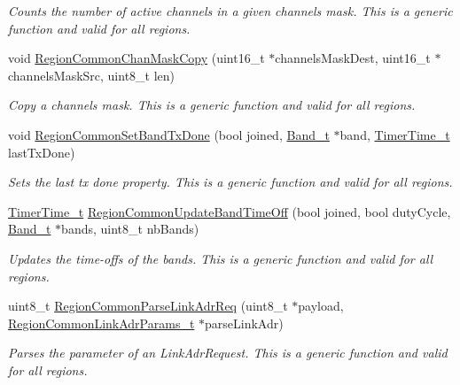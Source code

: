\begin{DoxyCompactItemize}
\begin{DoxyCompactList}\small\item\em Counts the number of active channels in a given channels mask. This is a generic function and valid for all regions. \end{DoxyCompactList}\item 
void \mbox{\hyperlink{group___r_e_g_i_o_n_c_o_m_m_o_n_ga95f5199d490113269fae7f2e0569e9a0}{Region\+Common\+Chan\+Mask\+Copy}} (uint16\+\_\+t $\ast$channels\+Mask\+Dest, uint16\+\_\+t $\ast$channels\+Mask\+Src, uint8\+\_\+t len)
\begin{DoxyCompactList}\small\item\em Copy a channels mask. This is a generic function and valid for all regions. \end{DoxyCompactList}\item 
void \mbox{\hyperlink{group___r_e_g_i_o_n_c_o_m_m_o_n_ga491dea5590228a0cd33affd71743779c}{Region\+Common\+Set\+Band\+Tx\+Done}} (bool joined, \mbox{\hyperlink{group___l_o_r_a_m_a_c_ga8f49721ee96ceb52c80a896ab11a2ed8}{Band\+\_\+t}} $\ast$band, \mbox{\hyperlink{utilities_8h_a4215ca43d3e953099ea758ce428599d0}{Timer\+Time\+\_\+t}} last\+Tx\+Done)
\begin{DoxyCompactList}\small\item\em Sets the last tx done property. This is a generic function and valid for all regions. \end{DoxyCompactList}\item 
\mbox{\hyperlink{utilities_8h_a4215ca43d3e953099ea758ce428599d0}{Timer\+Time\+\_\+t}} \mbox{\hyperlink{group___r_e_g_i_o_n_c_o_m_m_o_n_ga2e26fe6b49ca26edf7052eadd7f18b3a}{Region\+Common\+Update\+Band\+Time\+Off}} (bool joined, bool duty\+Cycle, \mbox{\hyperlink{group___l_o_r_a_m_a_c_ga8f49721ee96ceb52c80a896ab11a2ed8}{Band\+\_\+t}} $\ast$bands, uint8\+\_\+t nb\+Bands)
\begin{DoxyCompactList}\small\item\em Updates the time-\/offs of the bands. This is a generic function and valid for all regions. \end{DoxyCompactList}\item 
uint8\+\_\+t \mbox{\hyperlink{group___r_e_g_i_o_n_c_o_m_m_o_n_ga8403c78482dbb901014dba48b75d78e8}{Region\+Common\+Parse\+Link\+Adr\+Req}} (uint8\+\_\+t $\ast$payload, \mbox{\hyperlink{group___r_e_g_i_o_n_c_o_m_m_o_n_ga6e1aaa6b8d179e2daffac8d1e23d7f24}{Region\+Common\+Link\+Adr\+Params\+\_\+t}} $\ast$parse\+Link\+Adr)
\begin{DoxyCompactList}\small\item\em Parses the parameter of an Link\+Adr\+Request. This is a generic function and valid for all regions. \end{DoxyCompactList}\item 

\end{DoxyCompactItemize}
